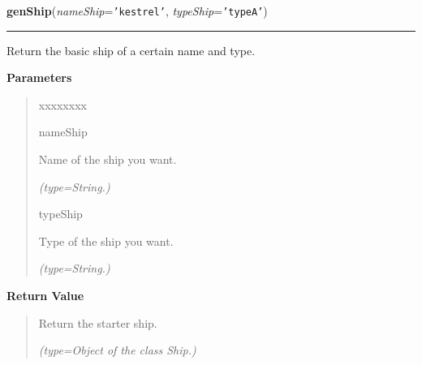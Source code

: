 \hspace{.8\funcindent}\begin{boxedminipage}{\funcwidth}

    \raggedright \textbf{genShip}(\textit{nameShip}={\tt \texttt{'}\texttt{kestrel}\texttt{'}}, \textit{typeShip}={\tt \texttt{'}\texttt{typeA}\texttt{'}})

    \vspace{-1.5ex}

    \rule{\textwidth}{0.5\fboxrule}
\setlength{\parskip}{2ex}
    Return the basic ship of a certain name and type.

\setlength{\parskip}{1ex}
      \textbf{Parameters}
      \vspace{-1ex}

      \begin{quote}
        \begin{Ventry}{xxxxxxxx}

          \item[nameShip]

          Name of the ship you want.

            {\it (type=String.)}

          \item[typeShip]

          Type of the ship you want.

            {\it (type=String.)}

        \end{Ventry}

      \end{quote}

      \textbf{Return Value}
    \vspace{-1ex}

      \begin{quote}
      Return the starter ship.

      {\it (type=Object of the class Ship.)}

      \end{quote}

    \end{boxedminipage}

    \label{ships_layouts:listString2listInt}

    \vspace{0.5ex}

